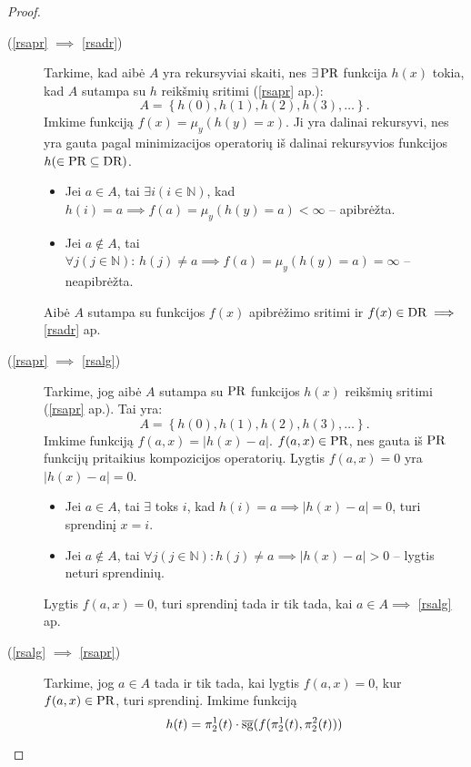 \begin{prop}
\begin{proof}
    \begin{description}
      \item[(\ref{rsapr} $\implies$ \ref{rsadr})]
        Tarkime, kad aibė $A$ yra rekursyviai skaiti, nes $\exists \mathop{\text{PR}}$
        funkcija $h(x)$ tokia, kad $A$ sutampa su $h$ reikšmių 
        sritimi (\ref{rsapr} ap.):
        \[
        A = \left\{ h(0), h(1), h(2), h(3), \dotsc \right\}.
        \]
        Imkime funkciją $f(x) = \mu_{y}(h(y) = x)$. Ji yra dalinai 
        rekursyvi, nes yra gauta pagal minimizacijos operatorių iš
        dalinai rekursyvios funkcijos $h (\in \mathop{\text{PR}} \subseteq \mathop{\text{DR}})$.
        \begin{itemize}
          \item Jei $a \in A$, tai $\exists i(i \in \mathbb{N})$, kad
            $h(i) = a \implies f(a) = \mu_{y}(h(y) = a) < \infty$ 
            – apibrėžta.
          \item Jei $a \not \in A$, tai 
            $\forall j (j \in \mathbb{N}): \, h(j) \neq a \implies%
            f(a) = \mu_{y}(h(y) = a) = \infty$ – neapibrėžta.
        \end{itemize}
        Aibė $A$ sutampa su funkcijos $f(x)$ apibrėžimo sritimi ir
        $f(x) \in \mathop{\text{DR}} \implies$ \ref{rsadr} ap.
      \item[(\ref{rsapr} $\implies$ \ref{rsalg})] 
        Tarkime, jog aibė $A$ sutampa su $\mathop{\text{PR}}$ funkcijos
        $h(x)$ reikšmių sritimi (\ref{rsapr} ap.). Tai yra:
        \[
        A = \left\{ h(0),h(1),h(2),h(3),\dotsc \right\}.
        \]
        Imkime funkciją $f(a,x) = |h(x)-a|$. $f(a, x) \in \mathop{\text{PR}}$, nes gauta
        iš $\mathop{\text{PR}}$ funkcijų pritaikius kompozicijos operatorių. Lygtis
        $f(a,x) = 0$ yra $|h(x) - a| = 0$.
        \begin{itemize}
          \item Jei $a \in A$, tai $\exists$ toks $i$, kad 
            $h(i)=a \implies |h(x) - a| = 0$, turi sprendinį $x = i$.
          \item Jei $a \not \in A$, tai 
            $\forall j (j \in \mathbb{N}): h(j) \neq a \implies %
            |h(x) - a| > 0$ – lygtis neturi sprendinių.
        \end{itemize}
        Lygtis $f(a,x)=0$, turi sprendinį tada ir tik tada, 
        kai $a \in A \implies$ \ref{rsalg} ap.
      \item[(\ref{rsalg} $\implies$ \ref{rsapr})]
        Tarkime, jog $a \in A$ tada ir tik tada, kai lygtis 
        $f(a,x) = 0$, kur $f(a,x) \in \mathop{\text{PR}}$, turi sprendinį.
        Imkime funkciją
        \[
        h(t)=\pi^{1}_{2}(t) \cdot \sgi(f(\pi^{1}_{2}(t),\pi^{2}_{2}(t)))%
\]
\end{description}
\end{proof}
\end{prop}
